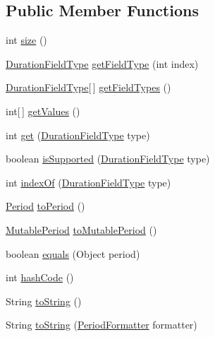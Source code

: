 \subsection*{Public Member Functions}
\begin{DoxyCompactItemize}
\item 
int \hyperlink{classorg_1_1joda_1_1time_1_1base_1_1_abstract_period_ad3d943a6c7e3e78d33ae86d4fcd6064a}{size} ()
\item 
\hyperlink{classorg_1_1joda_1_1time_1_1_duration_field_type}{Duration\-Field\-Type} \hyperlink{classorg_1_1joda_1_1time_1_1base_1_1_abstract_period_a2f366ba30cb3ef23e5e0af16545daa9c}{get\-Field\-Type} (int index)
\item 
\hyperlink{classorg_1_1joda_1_1time_1_1_duration_field_type}{Duration\-Field\-Type}\mbox{[}$\,$\mbox{]} \hyperlink{classorg_1_1joda_1_1time_1_1base_1_1_abstract_period_af1f7cdd7d8ead7035218027feeac3a20}{get\-Field\-Types} ()
\item 
int\mbox{[}$\,$\mbox{]} \hyperlink{classorg_1_1joda_1_1time_1_1base_1_1_abstract_period_a9aa2d766fc8e03ca5f5d279aad357265}{get\-Values} ()
\item 
int \hyperlink{classorg_1_1joda_1_1time_1_1base_1_1_abstract_period_adced56e70e842485e0396f8dfe428cc5}{get} (\hyperlink{classorg_1_1joda_1_1time_1_1_duration_field_type}{Duration\-Field\-Type} type)
\item 
boolean \hyperlink{classorg_1_1joda_1_1time_1_1base_1_1_abstract_period_a74d471025dd6d99c700ad3d7bf08a0d7}{is\-Supported} (\hyperlink{classorg_1_1joda_1_1time_1_1_duration_field_type}{Duration\-Field\-Type} type)
\item 
int \hyperlink{classorg_1_1joda_1_1time_1_1base_1_1_abstract_period_ab07cca94e9c65f254cacfff78effcb39}{index\-Of} (\hyperlink{classorg_1_1joda_1_1time_1_1_duration_field_type}{Duration\-Field\-Type} type)
\item 
\hyperlink{classorg_1_1joda_1_1time_1_1_period}{Period} \hyperlink{classorg_1_1joda_1_1time_1_1base_1_1_abstract_period_a426c9cd3a412a7427aef7252484dee33}{to\-Period} ()
\item 
\hyperlink{classorg_1_1joda_1_1time_1_1_mutable_period}{Mutable\-Period} \hyperlink{classorg_1_1joda_1_1time_1_1base_1_1_abstract_period_ae97812d50c18357dd61f05b518a3e679}{to\-Mutable\-Period} ()
\item 
boolean \hyperlink{classorg_1_1joda_1_1time_1_1base_1_1_abstract_period_a803080258e20018555e3eb95ac75c3db}{equals} (Object period)
\item 
int \hyperlink{classorg_1_1joda_1_1time_1_1base_1_1_abstract_period_a618c2e11da985c8f995d8e16bb1a3ef5}{hash\-Code} ()
\item 
String \hyperlink{classorg_1_1joda_1_1time_1_1base_1_1_abstract_period_adf7381fed44ce148d0576e6defaaa229}{to\-String} ()
\item 
String \hyperlink{classorg_1_1joda_1_1time_1_1base_1_1_abstract_period_adf30fc523a58f60a709e441b0a1cbf82}{to\-String} (\hyperlink{classorg_1_1joda_1_1time_1_1format_1_1_period_formatter}{Period\-Formatter} formatter)
\end{DoxyCompactItemize}
